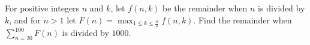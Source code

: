 For positive integers $n$ and $k$, let $f(n,k)$ be the remainder when $n$ is divided by $k$, and for $n>1$ let $F(n) = \displaystyle\max_{1 \le k \le \frac{n}{2}} f(n,k)$.  Find the remainder when $\displaystyle\sum_{n=20}^{100} F(n)$ is divided by $1000$.
